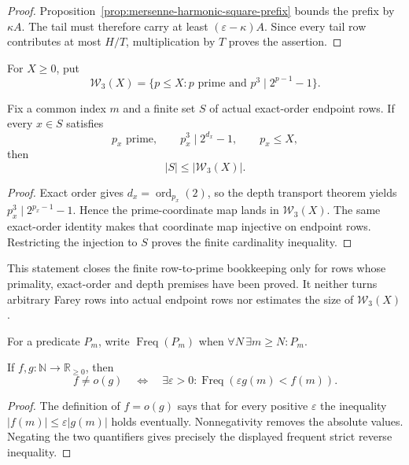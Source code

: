 \begin{proof}
Proposition~\ref{prop:mersenne-harmonic-square-prefix} bounds the prefix by
$\kappa A$.  The tail must therefore carry at least
$(\varepsilon-\kappa)A$.  Since every tail row contributes at most $H/T$,
multiplication by $T$ proves the assertion.
\end{proof}

For $X\ge0$, put
\[
 \mathcal W_3(X)=\{p\le X:p\text{ prime and }p^3\mid2^{p-1}-1\}.
\]

\begin{proposition}
\label{prop:mersenne-finite-row-super-wieferich}
Fix a common index $m$ and a finite set $S$ of actual exact-order endpoint
rows.  If every $x\in S$ satisfies
\[
 p_x\text{ prime},\qquad p_x^3\mid2^{d_x}-1,
 \qquad p_x\le X,
\]
then
\[
 |S|\le|\mathcal W_3(X)|.
\]
\end{proposition}

\begin{proof}
Exact order gives $d_x=\operatorname{ord}_{p_x}(2)$, so the depth transport
theorem yields $p_x^3\mid2^{p_x-1}-1$.  Hence the prime-coordinate map lands
in $\mathcal W_3(X)$.  The same exact-order identity makes that coordinate
map injective on endpoint rows.  Restricting the injection to $S$ proves the
finite cardinality inequality.
\end{proof}

This statement closes the finite row-to-prime bookkeeping only for rows
whose primality, exact-order and depth premises have been proved.  It neither
turns arbitrary Farey rows into actual endpoint rows nor estimates the size
of $\mathcal W_3(X)$.

For a predicate $P_m$, write $\operatorname{Freq}(P_m)$ when
$\forall N\,\exists m\ge N:P_m$.

\begin{proposition}
\label{prop:mersenne-not-little-o-frequent}
If $f,g:\mathbb N\to\mathbb R_{\ge0}$, then
\[
 f\ne o(g)
 \quad\Longleftrightarrow\quad
 \exists\varepsilon>0:\operatorname{Freq}(\varepsilon g(m)<f(m)).
\]
\end{proposition}

\begin{proof}
The definition of $f=o(g)$ says that for every positive $\varepsilon$ the
inequality $|f(m)|\le\varepsilon|g(m)|$ holds eventually.  Nonnegativity
removes the absolute values.  Negating the two quantifiers gives precisely
the displayed frequent strict reverse inequality.
\end{proof}

